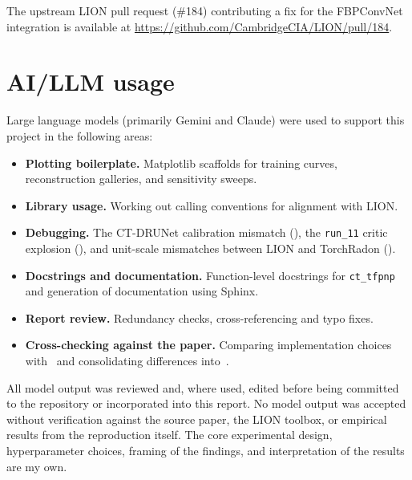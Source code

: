 The upstream LION pull request (\#184) contributing a fix for the FBPConvNet integration is available at \url{https://github.com/CambridgeCIA/LION/pull/184}.

\section{AI/LLM usage}
\label{sec:ai-usage}

Large language models (primarily Gemini and Claude) were used to support this project in the following areas:

\begin{itemize}
    \item \textbf{Plotting boilerplate.} Matplotlib scaffolds for training curves, reconstruction galleries, and       sensitivity sweeps.
    \item \textbf{Library usage.} Working out calling conventions for alignment with LION.
    \item \textbf{Debugging.} The CT-DRUNet calibration mismatch (), the \texttt{run\_11}           critic explosion (), and unit-scale mismatches between LION and TorchRadon                   ().
    \item \textbf{Docstrings and documentation.} Function-level docstrings for \texttt{ct\_tfpnp} and generation        of documentation using Sphinx.
    \item \textbf{Report review.} Redundancy checks, cross-referencing and typo fixes.
    \item \textbf{Cross-checking against the paper.} Comparing implementation choices with~\citet{Wei2022TFPnP}         and consolidating differences into~.
\end{itemize}

All model output was reviewed and, where used, edited before being committed to the repository or incorporated into this report. No model output was accepted without verification against the source paper, the LION toolbox, or empirical results from the reproduction itself. The core experimental design, hyperparameter choices, framing of the findings, and interpretation of the results are my own.
